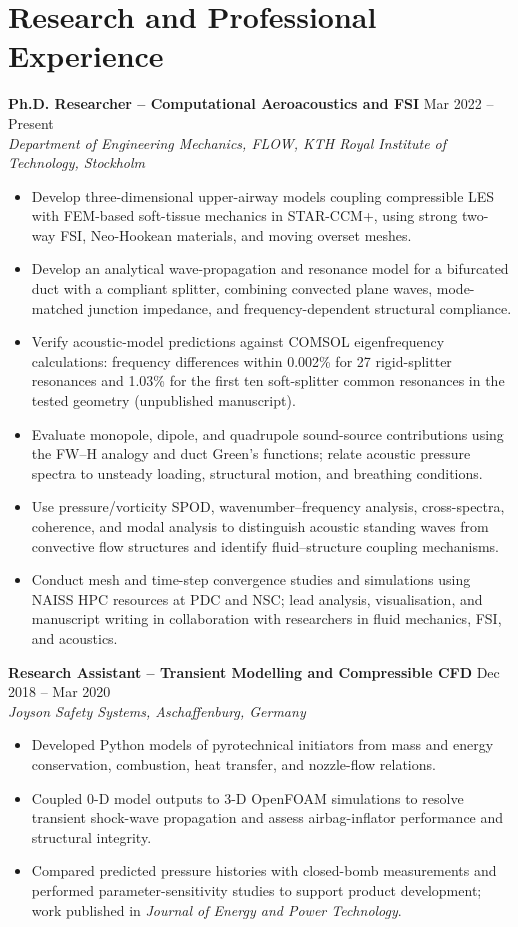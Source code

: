 \documentclass[a4paper,10pt]{article}
\begin{document}
\section{Research and Professional Experience}
\textbf{Ph.D. Researcher -- Computational Aeroacoustics and FSI}
\hfill Mar 2022 -- Present\\
\textit{Department of Engineering Mechanics, FLOW, KTH Royal Institute of Technology, Stockholm}
\begin{itemize}
\item Develop three-dimensional upper-airway models coupling compressible LES with
FEM-based soft-tissue mechanics in STAR-CCM+, using strong two-way FSI,
Neo-Hookean materials, and moving overset meshes.
\item Develop an analytical wave-propagation and resonance model for a bifurcated duct
with a compliant splitter, combining convected plane waves, mode-matched junction
impedance, and frequency-dependent structural compliance.
\item Verify acoustic-model predictions against COMSOL eigenfrequency calculations:
frequency differences within 0.002\% for 27 rigid-splitter resonances and 1.03\% for
the first ten soft-splitter common resonances in the tested geometry
(unpublished manuscript).
\item Evaluate monopole, dipole, and quadrupole sound-source contributions using the
FW--H analogy and duct Green's functions; relate acoustic pressure spectra to
unsteady loading, structural motion, and breathing conditions.
\item Use pressure/vorticity SPOD, wavenumber--frequency analysis, cross-spectra,
coherence, and modal analysis to distinguish acoustic standing waves from convective
flow structures and identify fluid--structure coupling mechanisms.
\item Conduct mesh and time-step convergence studies and simulations using NAISS
HPC resources at PDC and NSC; lead analysis, visualisation, and manuscript writing
in collaboration with researchers in fluid mechanics, FSI, and acoustics.
\end{itemize}

\vspace{3pt}
\textbf{Research Assistant -- Transient Modelling and Compressible CFD}
\hfill Dec 2018 -- Mar 2020\\
\textit{Joyson Safety Systems, Aschaffenburg, Germany}
\begin{itemize}
\item Developed Python models of pyrotechnical initiators from mass and energy
conservation, combustion, heat transfer, and nozzle-flow relations.
\item Coupled 0-D model outputs to 3-D OpenFOAM simulations to resolve transient
shock-wave propagation and assess airbag-inflator performance and structural integrity.
\item Compared predicted pressure histories with closed-bomb measurements and
performed parameter-sensitivity studies to support product development;
work published in \textit{Journal of Energy and Power Technology}.
\end{itemize}
\end{document}
